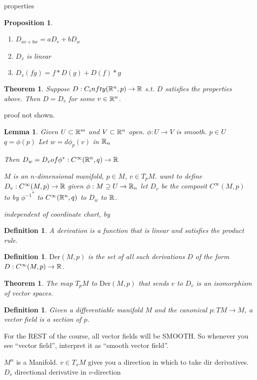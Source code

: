 \documentclass[11pt]{amsbook}
\newenvironment{dateenv}{
	\vspace{1em}
}{
	\vspace{1em}
}
\newcommand{\mydate}[4]{
	\newdate{#1}{#2}{#3}{#4}
	\begin{dateenv}
		\hfill\displaydate{#1}
	\end{dateenv}
}
\theoremstyle{mystyle} \newtheorem{thrm}[thm]{Theorem}
\theoremstyle{mystyle} \newtheorem{defi}[thm]{Definition}
\theoremstyle{mystyle} \newtheorem{coro}[thm]{Corollary}
\theoremstyle{mystyle} \newtheorem{propo}[thm]{Proposition}
\theoremstyle{mystyle} \newtheorem{lemm}[thm]{Lemma}
\numberwithin{thm}{section}
\newcommand{\Der}{\text{Der}}
\newcommand{\de}{\emph}
\begin{document}
properties
\begin{propo}
	\begin{enumerate}
		\item $D_{av + bw} = aD_{v} + bD_{w}$
		\item $D_v$ is linear
		\item $D_v(fg) = f*D(g) + D(f)*g$
	\end{enumerate}
\end{propo}
\begin{thrm}
	Suppose $D : C_infty({\mathbb R}^n,p) \to {\mathbb R}$
	s.t. $D$ satisfies the properties above.  Then $D = D_v$ for some $v \in {\mathbb R}^n$.
\end{thrm}
proof not shown.
\begin{lemm}
	Given $U \subset {\mathbb R}^m$ and $V \subset {\mathbb R}^n$ open.
	$\phi : U \to V$ is smooth.
	$p \in U$
	$q = \phi(p)$
	Let
	$w = d \phi_p(v)$ in ${\mathbb R}_n$

	Then
	$D_w = D_v of \phi^* : C^\infty({\mathbb R}^n,q) \to {\mathbb R}$

	$M$ is an $n$-dimensional manifold, $p \in M$, $v \in T_pM$.
	want to define
	$D_v : C^\infty(M,p) \to {\mathbb R}$
	given $\phi: M \supseteq U \to {\mathbb R}_n$ let $D_v$ be the composit
	$C^\infty(M, p)$ to by ${\phi^{-1}}^*$ to $C^\infty({\mathbb R}^n,q)$ to $D_w$ to ${\mathbb R}$.

	independent of coordinate chart, by
\end{lemm}
\begin{defi}
	A \de{derivation} is a function that is linear and satisfies the product rule.
\end{defi}
\begin{defi}
	$\Der(M,p)$ is the set of all such derivations $D$ of the form $D: C^\infty(M,p) \to {\mathbb R}$.
\end{defi}
\begin{thrm}
	The map $T_pM$ to $\Der(M,p)$
	that sends $v$ to $D_v$
	is an isomorphism of vector spaces.
\end{thrm}

\mydate{d5}{10}{10}{2016}

\begin{defi}
	Given a differentiable manifold $M$ and the canonical $p: TM \to M$, a \de{vector field} is a section of $p$.
\end{defi}
\begin{rmk}
	For the REST of the course, all vector fields will be SMOOTH.  So whenever you see ``vector field'', interpret it as ``smooth vector field''.
\end{rmk}

$M^n$ is a Manifold.
$v \in T_xM$ gives you a direction in which to take dir derivatives.
$D_v$ directional derivative in $v$-direction
\end{document}
